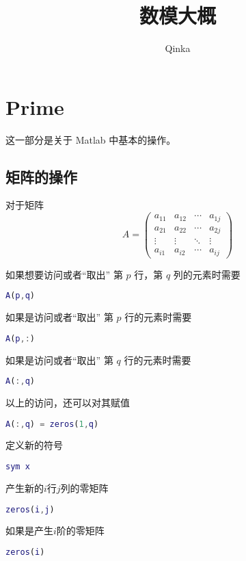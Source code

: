 \documentclass{ctexart}
\author{Qinka}
\title{数模大概}
\begin{document}
  \maketitle
  \section{Prime}
  \label{sec:prime}
  这一部分是关于 Matlab 中基本的操作。

  \subsection{矩阵的操作}
  \label{ssec:mat:base}
  对于矩阵
  $$A=\left(\begin{array}{cccc}
  a_{11} & a_{12} & \cdots & a_{1j} \\
  a_{21} & a_{22} & \cdots & a_{2j} \\
  \vdots & \vdots & \ddots & \vdots \\
  a_{i1} & a_{i2} & \cdots & a_{ij}
  \end{array}\right)$$

  如果想要访问或者“取出” 第 $p$ 行，第 $q$ 列的元素时需要
  \begin{lstlisting}[language=matlab]
    A(p,q)
  \end{lstlisting}

  如果是访问或者“取出” 第 $p$ 行的元素时需要
  \begin{lstlisting}[language=matlab]
    A(p,:)
  \end{lstlisting}

  如果是访问或者“取出” 第 $q$ 行的元素时需要
  \begin{lstlisting}[language=matlab]
    A(:,q)
  \end{lstlisting}

  以上的访问，还可以对其赋值
  \begin{lstlisting}[language=matlab]
    A(:,q) = zeros(1,q)
  \end{lstlisting}

  定义新的符号
  \begin{lstlisting}[language=matlab]
    sym x
  \end{lstlisting}

  产生新的$i$行$j$列的零矩阵
  \begin{lstlisting}[language=matlab]
    zeros(i,j)
  \end{lstlisting}
  如果是产生$i$阶的零矩阵
  \begin{lstlisting}[language=matlab]
    zeros(i)
  \end{lstlisting}
\end{document}
